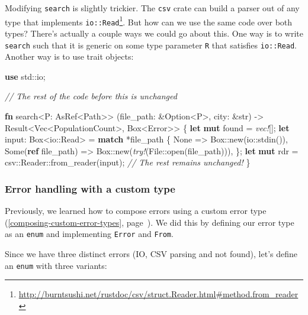 \documentclass[a4paper,]{book}
\renewcommand*{\hypertarget}[3][\ar]{%
  \def\ar{#2}%
  \label{#1}%
  #3}
\renewcommand*{\hyperlink}[2]{%
 #2 (\autoref{#1}, page~\pageref{#1})}
\newenvironment{Shaded}{\begin{snugshade}}{\end{snugshade}}
\newcommand{\KeywordTok}[1]{\textcolor[rgb]{0.13,0.29,0.53}{\textbf{{#1}}}}
\newcommand{\DataTypeTok}[1]{\textcolor[rgb]{0.13,0.29,0.53}{{#1}}}
\newcommand{\ConstantTok}[1]{\textcolor[rgb]{0.00,0.00,0.00}{{#1}}}
\newcommand{\CommentTok}[1]{\textcolor[rgb]{0.56,0.35,0.01}{\textit{{#1}}}}
\newcommand{\PreprocessorTok}[1]{\textcolor[rgb]{0.56,0.35,0.01}{\textit{{#1}}}}
\newcommand{\NormalTok}[1]{{#1}}
\renewcommand{\href}[2]{#2\footnote{\url{#1}}}
\begin{document}
Modifying \texttt{search} is slightly trickier. The \texttt{csv} crate
can build a parser out of
\href{http://burntsushi.net/rustdoc/csv/struct.Reader.html\#method.from_reader}{any
type that implements \texttt{io::Read}}. But how can we use the same
code over both types? There's actually a couple ways we could go about
this. One way is to write \texttt{search} such that it is generic on
some type parameter \texttt{R} that satisfies \texttt{io::Read}. Another
way is to use trait objects:

\begin{Shaded}
\begin{Highlighting}[]
\KeywordTok{use} \NormalTok{std::io;}

\CommentTok{// The rest of the code before this is unchanged}

\KeywordTok{fn} \NormalTok{search<P: AsRef<Path>>}
         \NormalTok{(file_path: &}\DataTypeTok{Option}\NormalTok{<P>, city: &}\DataTypeTok{str}\NormalTok{)}
         \NormalTok{-> }\DataTypeTok{Result}\NormalTok{<}\DataTypeTok{Vec}\NormalTok{<PopulationCount>, }\DataTypeTok{Box}\NormalTok{<Error>> \{}
    \KeywordTok{let} \KeywordTok{mut} \NormalTok{found = }\PreprocessorTok{vec!}\NormalTok{[];}
    \KeywordTok{let} \NormalTok{input: }\DataTypeTok{Box}\NormalTok{<io::Read> = }\KeywordTok{match} \NormalTok{*file_path \{}
        \ConstantTok{None} \NormalTok{=> }\DataTypeTok{Box}\NormalTok{::new(io::stdin()),}
        \ConstantTok{Some}\NormalTok{(}\KeywordTok{ref} \NormalTok{file_path) => }\DataTypeTok{Box}\NormalTok{::new(}\PreprocessorTok{try!}\NormalTok{(File::open(file_path))),}
    \NormalTok{\};}
    \KeywordTok{let} \KeywordTok{mut} \NormalTok{rdr = csv::Reader::from_reader(input);}
    \CommentTok{// The rest remains unchanged!}
\NormalTok{\}}
\end{Highlighting}
\end{Shaded}

\hypertarget{error-handling-with-a-custom-type}{\subsubsection{Error
handling with a custom type}\label{error-handling-with-a-custom-type}}

Previously, we learned how to
\protect\hyperlink{composing-custom-error-types}{compose errors using a
custom error type}. We did this by defining our error type as an
\texttt{enum} and implementing \texttt{Error} and \texttt{From}.

Since we have three distinct errors (IO, CSV parsing and not found),
let's define an \texttt{enum} with three variants:
\end{document}
